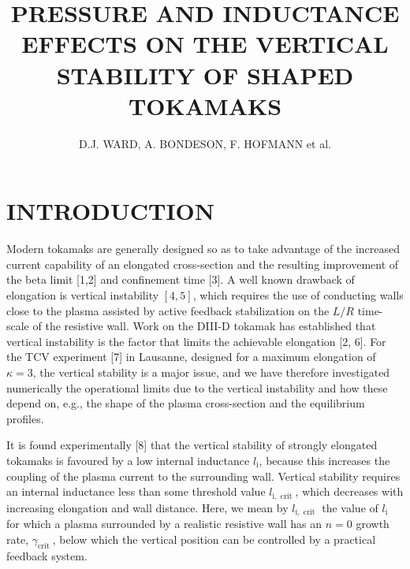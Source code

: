 \documentclass[utf8]{ctexart}
\title{PRESSURE AND INDUCTANCE EFFECTS ON THE VERTICAL STABILITY OF SHAPED TOKAMAKS }
\author{D.J. WARD,  A. BONDESON,  F. HOFMANN et al.}
\date{\paperref}
\newcommand\mainskip{-5pt}
\begin{document}
 \begin{sloppypar}
 \allowdisplaybreaks[3]  
 \setlength{\abovedisplayskip}{-6pt}
 \setlength{\belowdisplayskip}{10pt}
 \setlength{\abovedisplayshortskip}{0pt}
 \setlength{\belowdisplayshortskip}{0pt}
 \setlength{\parskip}{\mainskip}
 
 	\maketitle
 
 
 
 \section{INTRODUCTION}
 Modern tokamaks are generally designed so as to take advantage of the increased current capability of an elongated cross-section and the resulting improvement of the beta limit [1,2] and confinement time [3]. A well known drawback of elongation is vertical instability $[4,5]$, which requires the use of conducting walls close to the plasma assisted by active feedback stabilization on the $L / R$ time-scale of the resistive wall. Work on the DIII-D tokamak has established that vertical instability is the factor that limits the achievable elongation [2, 6]. For the TCV experiment [7] in Lausanne, designed for a maximum elongation of $\kappa=3$, the vertical stability is a major issue, and we have therefore investigated numerically the operational limits due to the vertical instability and how these depend on, e.g., the shape of the plasma cross-section and the equilibrium profiles.
 
 It is found experimentally [8] that the vertical stability of strongly elongated tokamaks is favoured by a low internal inductance $l_{\mathrm{i}}$, because this increases the coupling of the plasma current to the surrounding wall. Vertical stability requires an internal inductance less than some threshold value $l_{\mathrm{i}, \text { crit }}$, which decreases with increasing elongation and wall distance. Here, we mean by $l_{\mathrm{i}, \text { crit }}$ the value of $l_{\mathrm{i}}$ for which a plasma surrounded by a realistic resistive wall has an $n=0$ growth rate, $\gamma_{\text {crit }}$, below which the vertical position can be controlled by a practical feedback system.
 

\end{sloppypar}
\end{document}
